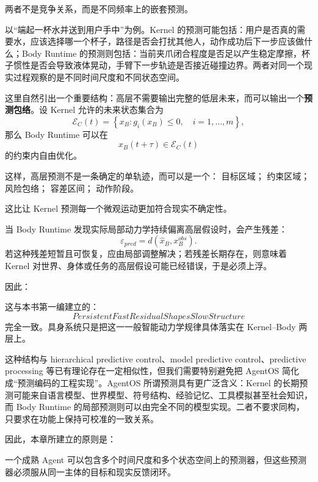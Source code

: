 两者不是竞争关系，而是不同频率上的嵌套预测。

以“端起一杯水并送到用户手中”为例。Kernel 的预测可能包括：用户是否真的需要水，应该选择哪一个杯子，路径是否会打扰其他人，动作成功后下一步应该做什么；Body Runtime 的预测则包括：当前夹爪闭合程度是否足以产生稳定摩擦，杯子惯性是否会导致液体晃动，手臂下一步轨迹是否接近碰撞边界。两者对同一个现实过程观察的是不同时间尺度和不同状态空间。

这里自然引出一个重要结构：高层不需要输出完整的低层未来，而可以输出一个\textbf{预测包络}。设 Kernel 允许的未来状态集合为
\[
\mathcal E_C(t)
=
\left\{
x_B:
g_i(x_B)\leq 0,
\quad i=1,\ldots,m
\right\},
\]
那么 Body Runtime 可以在
\[
x_B(t+\tau)\in\mathcal E_C(t)
\]
的约束内自由优化。

这样，高层预测不是一条确定的单轨迹，而可以是一个：
目标区域；
约束区域；
风险包络；
容差区间；
动作阶段。

这比让 Kernel 预测每一个微观运动更加符合现实不确定性。

当 Body Runtime 发现实际局部动力学持续偏离高层假设时，会产生残差：
\[
\varepsilon_{pred}
=
d
\left(
\hat x_B,
x_B^{obs}
\right).
\]
若这种残差短暂且可恢复，应由局部调整解决；若残差长期存在，则意味着 Kernel 对世界、身体或任务的高层假设可能已经错误，于是必须上浮。

因此：
\begin{statementbox}
\centering
{}
\end{statementbox}

这与本书第一编建立的：
\[
PersistentFastResidualShapesSlowStructure
\]
完全一致。具身系统只是把这一一般智能动力学规律具体落实在 Kernel--Body 两层上。

这种结构与 hierarchical predictive control、model predictive control、predictive processing 等已有理论存在一定相似性，但我们需要特别避免把 AgentOS 简化成“预测编码的工程实现”。AgentOS 所谓预测具有更广泛含义：Kernel 的长期预测可能来自语言模型、世界模型、符号结构、经验记忆、工具模拟甚至社会知识，而 Body Runtime 的局部预测则可以由完全不同的模型实现。二者不要求同构，只要求在功能上保持可校准的一致关系。

因此，本章所建立的原则是：
\begin{statementbox}
\centering
{}
\end{statementbox}
一个成熟 Agent 可以包含多个时间尺度和多个状态空间上的预测器，但这些预测器必须服从同一主体的目标和现实反馈闭环。

